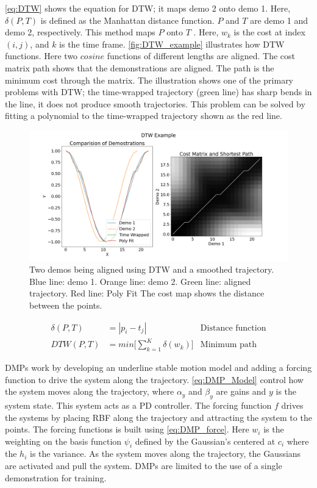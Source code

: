  \autoref{eq:DTW} shows the equation for DTW; it maps demo 2 onto demo 1. Here, $\delta (P, T)$ is defined as the Manhattan distance function. $P$ and $T$ are demo 1 and demo 2, respectively. This method maps $P$ onto $T$ . Here, $w_k$ is the cost at index $(i,j)$, and $k$ is the time frame. \autoref{fig:DTW_example} illustrates how DTW functions. Here two $cosine$ functions of different lengths are aligned. The cost matrix path shows that the demonstrations are aligned. The path is the minimum cost through the matrix. The illustration shows one of the primary problems with DTW; the time-wrapped trajectory (green line) has sharp bends in the line, it does not produce smooth trajectories. This problem can be solved by fitting a polynomial to the time-wrapped trajectory shown as the red line.  
 
 \begin{figure}
     \centering
     \includegraphics[scale=0.3]{images/background/DTW_example.png}
     \caption[DTW Example]{Two demos being aligned using DTW and a smoothed trajectory. Blue line: demo 1. Orange line: demo 2. Green line: aligned trajectory. Red line: Poly Fit The cost map shows the distance between the points. }
     \label{fig:DTW_example}
 \end{figure}

\begin{equation} 
    \begin{aligned} 
         \delta (P,T) &= | p_i - t_j| & \text{Distance function} \\ 
        DTW(P,T) &= min \Bigg[ \sum_{k=1}^{K} \delta (w_k) \Bigg] & \text{Minimum path} 
    \end{aligned} 
    \label{eq:DTW} 
\end{equation} 


DMPs work by developing an underline stable motion model and adding a forcing function to drive the system along the trajectory. \autoref{eq:DMP_Model} control how the system moves along the trajectory, where $\alpha_y$ and $\beta_y$ are gains and $y$ is the system state. This system acts as a PD controller. The forcing function $f$ drives the systems by placing RBF along the trajectory and attracting the system to the points. The forcing functions is built using \autoref{eq:DMP_force}. Here $w_i$ is the weighting on the basis function $\psi_i$ defined by the Gaussian's centered at $c_i$ where the $h_i$ is the variance. As the system moves along the trajectory, the Gaussians are activated and pull the system. DMPs are limited to the use of a single demonstration for training.  

